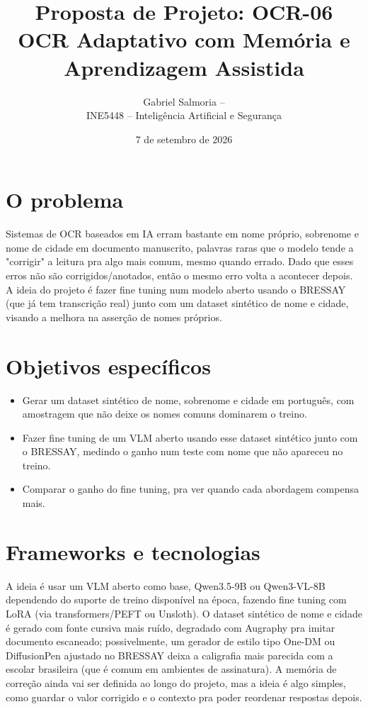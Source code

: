 \documentclass[10pt,a4paper]{article}
\title{\vspace{-2.5em}Proposta de Projeto: OCR-06\\\large OCR Adaptativo com Memória e Aprendizagem Assistida}
\author{Gabriel Salmoria \quad -- \quad 23100466 \\ \small INE5448 -- Inteligência Artificial e Segurança}
\date{\vspace{-0.5em}\small 7 de setembro de 2026\vspace{-1.5em}}
\begin{document}
\maketitle

\section{O problema}
Sistemas de OCR baseados em IA erram bastante em nome próprio, sobrenome e nome de cidade em documento manuscrito, palavras raras que o modelo tende a "corrigir" a leitura pra algo mais comum, mesmo quando errado. Dado que esses erros não são corrigidos/anotados, então o mesmo erro volta a acontecer depois. A ideia do projeto é fazer fine tuning num modelo aberto usando o BRESSAY (que já tem transcrição real) junto com um dataset sintético de nome e cidade, visando a melhora na asserção de nomes próprios.

\section{Objetivos específicos}
\begin{itemize}
\item Gerar um dataset sintético de nome, sobrenome e cidade em português, com amostragem que não deixe os nomes comuns dominarem o treino.
\item Fazer fine tuning de um VLM aberto usando esse dataset sintético junto com o BRESSAY, medindo o ganho num teste com nome que não apareceu no treino.
\item Comparar o ganho do fine tuning, pra ver quando cada abordagem compensa mais.
\end{itemize}

\section{Frameworks e tecnologias}
A ideia é usar um VLM aberto como base, Qwen3.5-9B ou Qwen3-VL-8B dependendo do suporte de treino disponível na época, fazendo fine tuning com LoRA (via transformers/PEFT ou Unsloth). O dataset sintético de nome e cidade é gerado com fonte cursiva mais ruído, degradado com Augraphy pra imitar documento escaneado; possivelmente, um gerador de estilo tipo One-DM ou DiffusionPen ajustado no BRESSAY deixa a caligrafia mais parecida com a escolar brasileira (que é comum em ambientes de assinatura). A memória de correção ainda vai ser definida ao longo do projeto, mas a ideia é algo simples, como guardar o valor corrigido e o contexto pra poder reordenar respostas depois.
\end{document}
